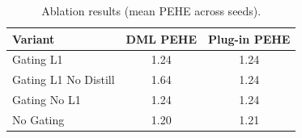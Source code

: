 \begin{table}[t]
\centering
\caption{Ablation results (mean PEHE across seeds).}
\label{tab:ablation}
\begin{tabular}{lcc}
\toprule
Variant & DML PEHE & Plug-in PEHE \\
\midrule
\midrule
Gating L1 & 1.24 & 1.24 \\
\toprule
Gating L1 No Distill & 1.64 & 1.24 \\
Gating No L1 & 1.24 & 1.24 \\
No Gating & 1.20 & 1.21 \\
\bottomrule
\bottomrule
\end{tabular}
\end{table}